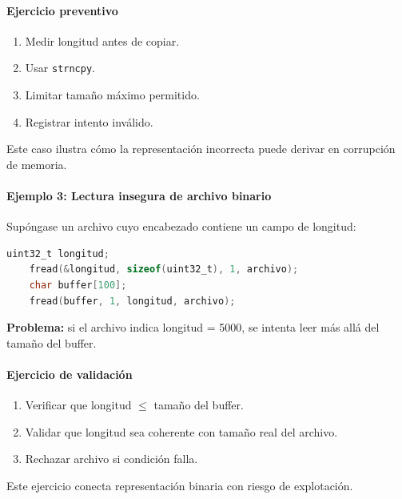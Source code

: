 \documentclass[12pt,twoside]{book}
\begin{document}
						\paragraph{Ejercicio preventivo}
						
						\begin{enumerate}
							\item Medir longitud antes de copiar.
							\item Usar \texttt{strncpy}.
							\item Limitar tamaño máximo permitido.
							\item Registrar intento inválido.
						\end{enumerate}
						
						\noindent
						Este caso ilustra cómo la representación incorrecta puede derivar en corrupción de memoria.
						
						\paragraph{Ejemplo 3: Lectura insegura de archivo binario}
						
						\noindent
						Supóngase un archivo cuyo encabezado contiene un campo de longitud:
						
						\begin{lstlisting}[language=C]
	uint32_t longitud;
	fread(&longitud, sizeof(uint32_t), 1, archivo);
	char buffer[100];
	fread(buffer, 1, longitud, archivo); \end{lstlisting}
						
						\noindent
						\textbf{Problema:} si el archivo indica longitud = 5000, se intenta leer más allá del tamaño del buffer.
						
						\paragraph{Ejercicio de validación}
						
						\begin{enumerate}
							\item Verificar que longitud $\leq$ tamaño del buffer.
							\item Validar que longitud sea coherente con tamaño real del archivo.
							\item Rechazar archivo si condición falla.
						\end{enumerate}
						
						\noindent
						Este ejercicio conecta representación binaria con riesgo de explotación.
						
\end{document}
